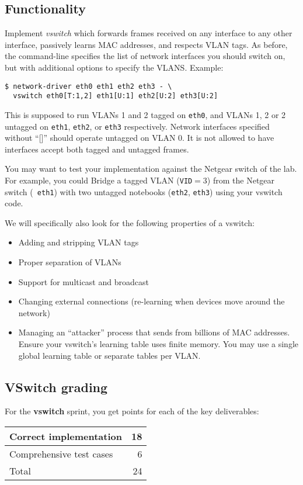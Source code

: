 \documentclass{article}
\begin{document}
\subsection{Functionality}

Implement {\em vswitch} which forwards frames received on any
interface to any other interface, passively learns MAC addresses,
and respects VLAN tags. As before, the command-line specifies the
list of network interfaces you should switch on, but with
additional options to specify the VLANS.  Example:
\begin{verbatim}
$ network-driver eth0 eth1 eth2 eth3 - \
  vswitch eth0[T:1,2] eth1[U:1] eth2[U:2] eth3[U:2]
\end{verbatim}
This is supposed to run VLANs 1 and 2 tagged on {\tt eth0},
and VLANs 1, 2 or 2 untagged on {\tt eth1}, {\tt eth2},
or {\tt eth3} respectively.  Network interfaces specified
without ``[]'' should operate untagged on VLAN 0.  It is
not allowed to have interfaces accept both tagged and
untagged frames.

You may want to test your implementation against the Netgear
switch of the lab. For example, you could
Bridge a tagged VLAN ({\tt VID}$=3$) from the Netgear switch ({\tt
  eth1}) with two untagged notebooks ({\tt eth2}, {\tt eth3}) using
your vswitch code.


We will specifically also look for the following properties of a vswitch:
\begin{itemize}
\item Adding and stripping VLAN tags
\item Proper separation of VLANs
\item Support for multicast and broadcast
\item Changing external connections (re-learning when devices move around the network)
\item Managing an ``attacker'' process that sends from billions of MAC
  addresses.  Ensure your vswitch's learning table uses finite memory.
  You may use a single global learning table or separate tables per VLAN.
\end{itemize}





\subsection{VSwitch grading}

For the {\bf vswitch} sprint, you get points for each of the key deliverables:
\begin{center}
\begin{tabular}{l|r}
Correct implementation                    & 18 \\ \hline
Comprehensive test cases                  &  6 \\ \hline \hline
Total                                     & 24
\end{tabular}
\end{center}
\end{document}
